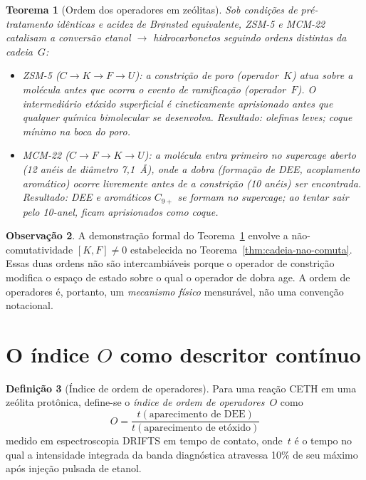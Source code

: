 \documentclass[12pt,a4paper,twoside]{book}
\theoremstyle{plain}
\newtheorem{teorema}{Teorema}[section]
\theoremstyle{definition}
\theoremstyle{definition}
\newtheorem{definicao}[teorema]{Definição}
\newtheorem{observacao}[teorema]{Observação}
\begin{document}
\begin{teorema}[Ordem dos operadores em zeólitas]\label{thm:ordem-zeolitas}
Sob condições de pré-tratamento idênticas e acidez de Brønsted equivalente,
ZSM-5 e MCM-22 catalisam a conversão etanol $\to$ hidrocarbonetos
seguindo ordens distintas da cadeia~$G$:
\begin{itemize}
  \item \emph{ZSM-5} ($C \to K \to F \to U$): a constrição de poro (operador~$K$)
        atua sobre a molécula antes que ocorra o evento de ramificação
        (operador~$F$). O intermediário etóxido superficial é cineticamente
        aprisionado antes que qualquer química bimolecular se desenvolva.
        Resultado: olefinas leves; coque mínimo na boca do poro.
  \item \emph{MCM-22} ($C \to F \to K \to U$): a molécula entra primeiro
        no supercage aberto (12 anéis de diâmetro 7,1~Å), onde a dobra
        (formação de DEE, acoplamento aromático) ocorre livremente
        antes de a constrição (10 anéis) ser encontrada. Resultado: DEE
        e aromáticos $C_{9+}$ se formam no supercage; ao tentar sair
        pelo 10-anel, ficam aprisionados como coque.
\end{itemize}
\end{teorema}

\begin{observacao}
A demonstração formal do Teorema~\ref{thm:ordem-zeolitas} envolve a
não-comutatividade $[K,F] \ne 0$ estabelecida no
Teorema~\ref{thm:cadeia-nao-comuta}. Essas duas ordens não são
intercambiáveis porque o operador de constrição modifica o espaço de
estado sobre o qual o operador de dobra age. A ordem de operadores é,
portanto, um \emph{mecanismo físico} mensurável, não uma convenção
notacional.
\end{observacao}

\section{O índice $O$ como descritor contínuo}

\begin{definicao}[Índice de ordem de operadores]\label{def:O-indice}
Para uma reação CETH em uma zeólita protônica, define-se o \emph{índice
de ordem de operadores}~$O$ como
\[
  O = \frac{t(\text{aparecimento de DEE})}{t(\text{aparecimento de etóxido})}
\]
medido em espectroscopia DRIFTS em tempo de contato, onde~$t$ é o tempo
no qual a intensidade integrada da banda diagnóstica atravessa 10\%
de seu máximo após injeção pulsada de etanol.
\end{definicao}
\end{document}
